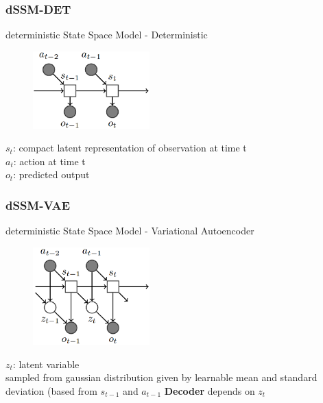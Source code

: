 \begin{frame}
	\frametitle{dSSM-DET}
	\vspace{-10mm}
	deterministic State Space Model - Deterministic
	\begin{multicols}{2}
		\begin{figure}[h]
			\includegraphics[width=0.4\textwidth]{./latent_i2a_images/dSSM_DET_architecture.png}	
		\end{figure}
		\columnbreak
		$s_t$: compact latent representation of observation at time t\\
		$a_t$: action at time t\\
		$o_t$: predicted output
	\end{multicols}
%	
\end{frame}

\begin{frame}
	\frametitle{dSSM-VAE}
	\vspace{-10mm}
	deterministic State Space Model - Variational Autoencoder
	\begin{multicols}{2}
		\begin{figure}[h]
			\includegraphics[width=0.4\textwidth]{./latent_i2a_images/dSSM_VAE_architecture.png}	
		\end{figure}
		\columnbreak
		$z_t$: latent variable\\
		 sampled from gaussian distribution given by learnable mean and standard deviation (based from $s_{t-1}$ and $a_{t-1}$
		\textbf{Decoder} depends on $z_t$
	\end{multicols}
\end{frame}


